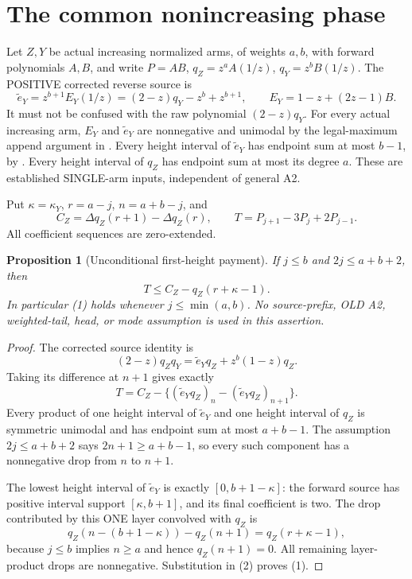 \documentclass[11pt]{article}
\newtheorem{proposition}{Proposition}[section]
\begin{document}
\section{The common nonincreasing phase}

\par\medskip

Let $Z,Y$ be actual increasing normalized arms, of weights $a,b$,
with forward polynomials $A,B$, and write $P=AB$,
$q_Z=z^aA(1/z)$, $q_Y=z^bB(1/z)$.
The POSITIVE corrected reverse source is
\[
 \widetilde e_Y=z^{b+1}E_Y(1/z)
    =(2-z)q_Y-z^b+z^{b+1},
 \qquad E_Y=1-z+(2z-1)B.
\]
It must not be confused with the raw polynomial $(2-z)q_Y$.
For every actual increasing arm, $E_Y$ and $\widetilde e_Y$ are
nonnegative and unimodal by the legal-maximum append argument in
{\normalfont{}}. Every height interval of
$\widetilde e_Y$ has endpoint sum at most $b-1$, by
{\normalfont{}}. Every height interval
of $q_Z$ has endpoint sum at most its degree $a$.
These are established SINGLE-arm inputs, independent of general A2.

Put $\kappa=\kappa_Y$, $r=a-j$, $n=a+b-j$, and
\[
 C_Z=\Delta q_Z(r+1)-\Delta q_Z(r),\qquad
 T=P_{j+1}-3P_j+2P_{j-1}.
\]
All coefficient sequences are zero-extended.

\begin{proposition}[Unconditional first-height payment]
If $j\le b$ and $2j\le a+b+2$, then
\[
 \boxed{T\le C_Z-q_Z(r+\kappa-1).}                 \tag{1}
\]
In particular (1) holds whenever $j\le\min(a,b)$.
No source-prefix, OLD A2, weighted-tail, head, or mode assumption
is used in this assertion.
\end{proposition}
\begin{proof}
The corrected source identity is
\[
 (2-z)q_Zq_Y=\widetilde e_Yq_Z+z^b(1-z)q_Z.
\]
Taking its difference at $n+1$ gives exactly
\[
 T=C_Z-\{(\widetilde e_Yq_Z)_n
                  -(\widetilde e_Yq_Z)_{n+1}\}.    \tag{2}
\]
Every product of one height interval of $\widetilde e_Y$ and
one height interval of $q_Z$ is symmetric unimodal and has
endpoint sum at most $a+b-1$. The assumption
$2j\le a+b+2$ says $2n+1\ge a+b-1$, so every such
component has a nonnegative drop from $n$ to $n+1$.

The lowest height interval of $\widetilde e_Y$ is exactly
$[0,b+1-\kappa]$: the forward source has positive interval
support $[\kappa,b+1]$, and its final coefficient is two.
The drop contributed by this ONE layer convolved with $q_Z$ is
\[
 q_Z(n-(b+1-\kappa))-q_Z(n+1)
   =q_Z(r+\kappa-1),
\]
because $j\le b$ implies $n\ge a$ and hence $q_Z(n+1)=0$.
All remaining layer-product drops are nonnegative. Substitution
in (2) proves (1).
\end{proof}
\end{document}
